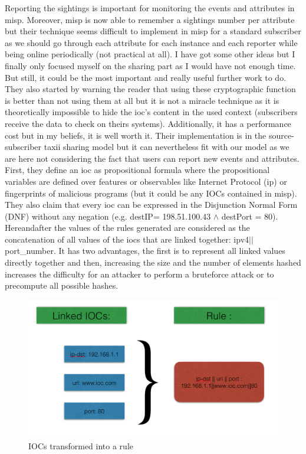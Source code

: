 \documentclass{eplmastersthesis}
\begin{document}
Reporting the sightings is important for monitoring the events and attributes in \gls{misp}.
Moreover, \gls{misp} is now able to remember a sightings number per attribute but their technique seems difficult to implement in \gls{misp} for a standard subscriber as we should go through each attribute for each instance and each reporter while being online periodically (not practical at all). I have got some other ideas but I finally only focused myself on the sharing part as I would have not enough time.
But still, it could be the most important and really useful further work to do.\\

They also started by warning the reader that using these cryptographic function is better than not using them at all but it is not a miracle technique as it is theoretically impossible to hide the \gls{ioc}’s content in the used context (subscribers receive the data to check on theirs systems).
Additionally, it has a performance cost but in my beliefs, it is well worth it. Their implementation is in the source-subscriber \gls{taxii} sharing model but it can nevertheless fit with our model as we are here not considering the fact that users can report new events and attributes.
First, they define an \gls{ioc} as propositional formula where the propositional variables are defined over features or observables like Internet Protocol (\gls{ip}) or fingerprints of malicious programs (but it could be any IOCs contained in \gls{misp}). They also claim that every \gls{ioc} can be expressed in the Disjunction Normal Form (DNF) without any negation (e.g. destIP= 198.51.100.43 $\land$ destPort = 80).
Hereandafter the values of the rules generated are considered as the concatenation of all values of the \gls{ioc}s that are linked together: \gls{ipv4}$||$port\_number. It has two advantages, the first is to represent all linked values directly together and then, increasing the size and the number of elements hashed increases the difficulty for an attacker to perform a bruteforce attack or to precompute all possible hashes.\\

\begin{figure}[h!]
\begin{center}
	\includegraphics[scale=0.5]{res/ioc-rules}
	\caption{IOCs transformed into a rule}
	\label{IOC-To-Rule}
\end{center}
\end{figure}
\end{document}
